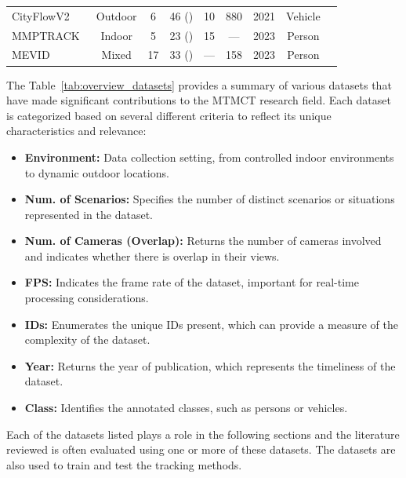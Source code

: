 \begin{table}[ht]
{\begin{tabular}{|l|c|c|c|c|c|c|c|c|}
			CityFlowV2~\cite{Tang19}             & Outdoor              & 6                          & 46 (\cmark)                        & 10           & 880          & 2021          & Vehicle         \\
			MMPTRACK~\cite{Han23}                & Indoor               & 5                          & 23 (\cmark)                        & 15           & ---          & 2023          & Person          \\
			MEVID~\cite{Davila23}                & Mixed                & 17                         & 33 (\cmark)                        & ---          & 158          & 2023          & Person          \\
			\hline
		\end{tabular}
	}
\end{table}

The Table~\ref{tab:overview_datasets} provides a summary of various datasets that have made significant contributions to the MTMCT research field. Each dataset is categorized based on several different criteria to reflect its unique characteristics and relevance:

\begin{itemize}
	\item \textbf{Environment:} Data collection setting, from controlled indoor environments to dynamic outdoor locations.
	\item \textbf{Num. of Scenarios:} Specifies the number of distinct scenarios or situations represented in the dataset.
	\item \textbf{Num. of Cameras (Overlap):} Returns the number of cameras involved and indicates whether there is overlap in their views.
	\item \textbf{FPS:} Indicates the frame rate of the dataset, important for real-time processing considerations.
	\item \textbf{IDs:} Enumerates the unique IDs present, which can provide a measure of the complexity of the dataset.
	\item \textbf{Year:} Returns the year of publication, which represents the timeliness of the dataset.
	\item \textbf{Class:} Identifies the annotated classes, such as persons or vehicles.
\end{itemize}

Each of the datasets listed plays a role in the following sections and the literature reviewed is often evaluated using one or more of these datasets. The datasets are also used to train and test the tracking methods.

